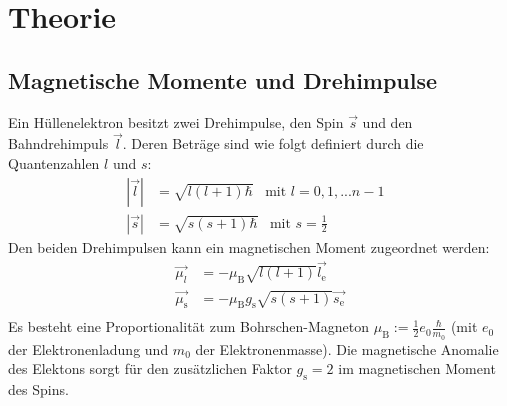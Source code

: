\section{Theorie}
\label{sec:Theorie}
\subsection{Magnetische Momente und Drehimpulse}
Ein Hüllenelektron besitzt zwei Drehimpulse, den Spin $\vec{s}$ und den Bahndrehimpuls $\vec{l}$.
Deren Beträge sind wie folgt definiert durch die Quantenzahlen $\textit{l}$ und $s$:
\begin{align}
  |\vec{l}|&=\sqrt{\textit{l}(\textit{l}+1)\hbar}\,\,\,\,\,\text{mit $\textit{l}=0,1,...n-1$ }\\
  |\vec{s}|&=\sqrt{s(s+1)\hbar}\,\,\,\,\,\text{mit $s=\frac{1}{2}$}\
\end{align}
Den beiden Drehimpulsen kann ein magnetischen Moment zugeordnet werden:
\begin{align}
  \vec{\mu_\mathrm{\textit{l}}}&=-\mu_\mathrm{B}\sqrt{\textit{l}(\textit{l}+1)}\vec{\textit{l}_\mathrm{e}}\\
  \vec{\mu_\mathrm{s}}&=-\mu_\mathrm{B} g_\mathrm{s}\sqrt{s(s+1)}\vec{s_\mathrm{e}}\\
\end{align}
Es besteht eine Proportionalität zum Bohrschen-Magneton $\mu_\mathrm{B}:=\frac{1}{2}e_\mathrm{0}\frac{\hbar}{m_\mathrm{0}}$
(mit $e_\mathrm{0}$ der Elektronenladung und $m_\mathrm{0}$ der Elektronenmasse).
Die magnetische Anomalie des Elektons sorgt für den zusätzlichen Faktor $g_\mathrm{s}=2$
im magnetischen Moment des Spins.

